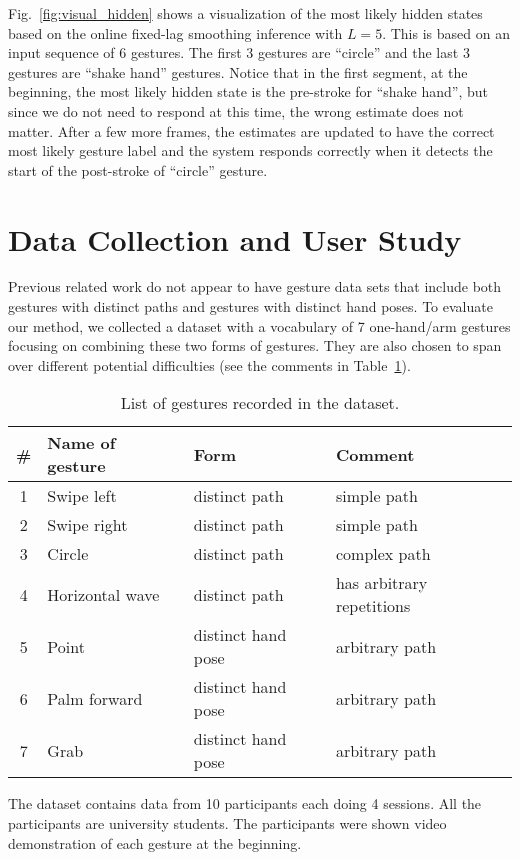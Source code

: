 Fig.~\ref{fig:visual_hidden} shows a visualization of the
most likely hidden states based on the online fixed-lag smoothing inference
with $L = 5$.
This is based on an input sequence of 6 gestures. The first 3 gestures are
``circle'' and the last 3 gestures are ``shake hand'' gestures. Notice that in
the first segment, at the beginning, the most likely hidden state is the
pre-stroke for ``shake hand'', but since we do not need to respond at this time,
the wrong estimate does not matter. After a few more frames, the estimates are
updated to have the correct most likely gesture label and the system
responds correctly when it detects the start of the post-stroke of ``circle''
gesture.

\section{Data Collection and User Study}
Previous related work do not appear to have gesture data sets
that include both gestures with distinct paths and gestures with distinct hand
poses. To evaluate our method, we collected a dataset with a vocabulary of 7
one-hand/arm gestures focusing on combining these two forms of gestures. They
are also chosen to span over different potential difficulties (see the comments in Table~\ref{tab:gestures}).

\begin{table}
\caption{List of gestures recorded in the dataset.}
\label{tab:gestures}
\centering
\begin{tabular}{|c|l|l|l|}
\hline
\# & Name of gesture & Form & Comment \\
\hline
1 & Swipe left & distinct path & simple path \\
\hline
2 & Swipe right & distinct path & simple path \\
\hline
3 & Circle & distinct path & complex path \\
\hline
4 & Horizontal wave & distinct path & has arbitrary repetitions \\
\hline
5 & Point & distinct hand pose & arbitrary path \\
\hline
6 & Palm forward & distinct hand pose & arbitrary path \\
\hline
7 & Grab & distinct hand pose & arbitrary path \\
\hline
\end{tabular}
\end{table}

The dataset contains data from 10 participants each
doing 4 sessions. All the participants are university students.
The participants were shown video demonstration of each gesture at the beginning. 

